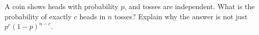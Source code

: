 A coin shows heads with probability $p$, and tosses are independent. What is the probability of exactly $c$ heads in $n$ tosses? Explain why the answer is not just $p^c(1-p)^{n-c}$.
